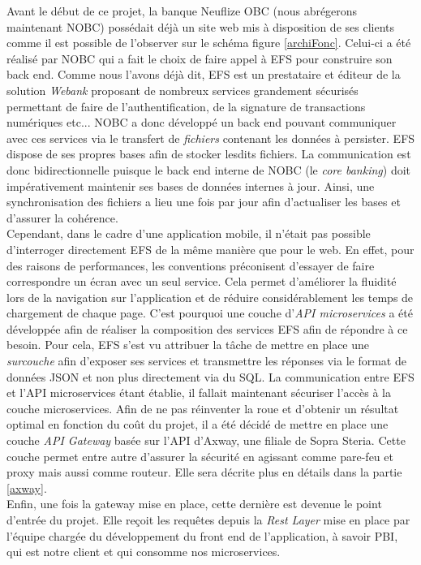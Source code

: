 	Avant le début de ce projet, la banque Neuflize OBC (nous abrégerons maintenant NOBC) possédait déjà un site web mis à disposition de ses clients comme il est possible de l'observer sur le schéma figure \ref{archiFonc}. Celui-ci a été réalisé par NOBC qui a fait le choix de faire appel à EFS pour construire son back end. Comme nous l'avons déjà dit, EFS est un prestataire et éditeur de la solution \textit{Webank} proposant de nombreux services grandement sécurisés permettant de faire de l'authentification, de la signature de transactions numériques etc... NOBC a donc développé un back end pouvant communiquer avec ces services via le transfert de \textit{fichiers} contenant les données à persister. EFS dispose de ses propres bases afin de stocker lesdits fichiers. La communication est donc bidirectionnelle puisque le back end interne de NOBC (le \textit{core banking}) doit impérativement maintenir ses bases de données internes à jour. Ainsi, une synchronisation des fichiers a lieu une fois par jour afin d'actualiser les bases et d'assurer la cohérence. \\
	
	Cependant, dans le cadre d'une application mobile, il n'était pas possible d'interroger directement EFS de la même manière que pour le web. En effet, pour des raisons de performances, les conventions préconisent d'essayer de faire correspondre un écran avec un seul service. Cela permet d'améliorer la fluidité lors de la navigation sur l'application et de réduire considérablement les temps de chargement de chaque page. C'est pourquoi une couche d'\textit{API microservices} a été développée afin de réaliser la composition des services EFS afin de répondre à ce besoin. Pour cela, EFS s'est vu attribuer la tâche de mettre en place une \textit{surcouche} afin d'exposer ses services et transmettre les réponses via le format de données JSON et non plus directement via du SQL. La communication entre EFS et l'API microservices étant établie, il fallait maintenant sécuriser l'accès à la couche microservices. Afin de ne pas réinventer la roue et d'obtenir un résultat optimal en fonction du coût du projet, il a été décidé de mettre en place une couche \textit{API Gateway} basée sur l'API d'Axway, une filiale de Sopra Steria. Cette couche permet entre autre d'assurer la sécurité en agissant comme pare-feu et proxy mais aussi comme routeur. Elle sera décrite plus en détails dans la partie \ref{axway}.\\
	
	Enfin, une fois la gateway mise en place, cette dernière est devenue le point d'entrée du projet. Elle reçoit les requêtes depuis la \textit{Rest Layer} mise en place par l'équipe chargée du développement du front end de l'application, à savoir PBI, qui est notre client et qui consomme nos microservices. \\

